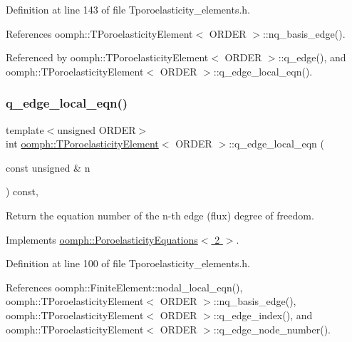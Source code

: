 Definition at line 143 of file Tporoelasticity\+\_\+elements.\+h.



References oomph\+::\+T\+Poroelasticity\+Element$<$ O\+R\+D\+E\+R $>$\+::nq\+\_\+basis\+\_\+edge().



Referenced by oomph\+::\+T\+Poroelasticity\+Element$<$ O\+R\+D\+E\+R $>$\+::q\+\_\+edge(), and oomph\+::\+T\+Poroelasticity\+Element$<$ O\+R\+D\+E\+R $>$\+::q\+\_\+edge\+\_\+local\+\_\+eqn().

\mbox{\label{classoomph_1_1TPoroelasticityElement_a662897b1eae45958e2ac4fe2cb5b63bf}} 
\subsubsection{\texorpdfstring{q\+\_\+edge\+\_\+local\+\_\+eqn()}{q\_edge\_local\_eqn()}}
{\footnotesize\ttfamily template$<$unsigned O\+R\+D\+ER$>$ \\
int \hyperlink{classoomph_1_1TPoroelasticityElement}{oomph\+::\+T\+Poroelasticity\+Element}$<$ O\+R\+D\+ER $>$\+::q\+\_\+edge\+\_\+local\+\_\+eqn (\begin{DoxyParamCaption}\item[{const unsigned \&}]{n }\end{DoxyParamCaption}) const\hspace{0.3cm}{\ttfamily [inline]}, {\ttfamily [virtual]}}



Return the equation number of the n-\/th edge (flux) degree of freedom. 



Implements \hyperlink{classoomph_1_1PoroelasticityEquations_a0a707c501fd4ae67a423de848845b04c}{oomph\+::\+Poroelasticity\+Equations$<$ 2 $>$}.



Definition at line 100 of file Tporoelasticity\+\_\+elements.\+h.



References oomph\+::\+Finite\+Element\+::nodal\+\_\+local\+\_\+eqn(), oomph\+::\+T\+Poroelasticity\+Element$<$ O\+R\+D\+E\+R $>$\+::nq\+\_\+basis\+\_\+edge(), oomph\+::\+T\+Poroelasticity\+Element$<$ O\+R\+D\+E\+R $>$\+::q\+\_\+edge\+\_\+index(), and oomph\+::\+T\+Poroelasticity\+Element$<$ O\+R\+D\+E\+R $>$\+::q\+\_\+edge\+\_\+node\+\_\+number().

